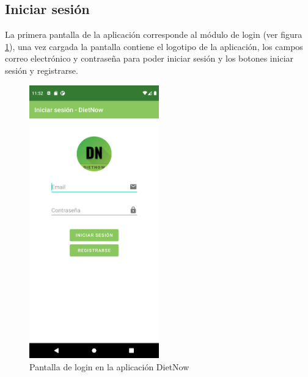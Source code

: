 \subsection{Iniciar sesión}
La primera pantalla de la aplicación corresponde al módulo de login (ver figura \ref{fig:login}), una vez cargada la pantalla contiene el logotipo de la aplicación, los campos correo electrónico y contraseña para poder iniciar sesión y los botones iniciar sesión y registrarse.

\begin{figure}[H]
    \centering
    \includegraphics[width=0.5\textwidth]{Images/Capitulo7/login.png}
        \caption{Pantalla de login en la aplicación DietNow}
    \label{fig:login}
\end{figure}


